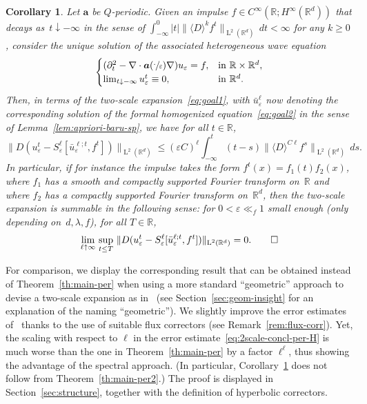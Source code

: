 \documentclass[10pt]{amsart}
\theoremstyle{plain}
\newtheorem{cor10}{Corollary}
\newenvironment{cor1}
{\renewcommand{\qedsymbol}{$\lozenge$}\pushQED{\qed}\begin{cor10}}
{\popQED\end{cor10}}
\theoremstyle{definition}
\numberwithin{equation}{section}
\newcommand{\e}{\varepsilon}
\newcommand{\R}{\mathbb R}
\newcommand{\Aa}{\boldsymbol a}
\newcommand{\Ld}{\operatorname{L}}
\begin{document}
\begin{cor1}\label{cor:summable}
Let $\Aa$ be $Q$-periodic. Given an impulse $f\in C^\infty(\R;H^\infty(\R^d))$ that decays as~$t\downarrow-\infty$ in the sense of $\int_{-\infty}^0|t|\|\langle D\rangle^kf^t\|_{\Ld^2(\R^d)}\,dt<\infty$ for any $k\ge0$,
consider the unique solution of the associated heterogeneous wave equation
\begin{equation*}
\begin{cases}
(\partial_t^2-\nabla\cdot\Aa(\sfrac\cdot\e)\nabla)u_\e=f,&\text{in $\R\times\R^d$},\\
{\lim_{t\downarrow -\infty}u_\e^t \equiv 0},&\text{in $\R^d$}.
\end{cases}
\end{equation*}
Then, in terms of the two-scale expansion~\eqref{eq:goal1}, with $\bar u_\e^\ell$ now denoting the corresponding solution of the formal homogenized equation~\eqref{eq:goal2} in the sense of Lemma~\ref{lem:apriori-baru-sp}, we have for all $t\in \R$,
\begin{equation}\label{e.bound-summable-1}
\|D(u_\e^t-S^{\ell}_\e[\bar u_\e^{\ell;t},f^t])\|_{\Ld^2(\R^d)} \le
(\e C)^\ell \int_{-\infty}^t(t-s)\|\langle D\rangle^{C\ell} f^s\|_{\Ld^2(\R^d)}\,ds.
\end{equation}
In particular, if for instance the impulse takes the form $f^t(x)=f_1(t)f_2(x)$, where $f_1$ has a smooth and compactly supported Fourier transform on~$\R$ and where $f_2$ has a compactly supported Fourier transform on~$\R^d$,
then the two-scale expansion is summable in the following sense: for $0<\e\ll_f 1$ small enough (only depending on~$d,\lambda,f$), for all $T\in\R$,
\begin{equation}\label{e.bound-summable-2}
\lim_{\ell\uparrow\infty}\,\sup_{t\le T}\,\|D(u_\e^t-S^{\ell}_\e[\bar u_\e^{\ell;t},f^t])\|_{\Ld^2(\R^d)} =0. \qedhere
\end{equation}
\end{cor1}

For comparison,
we display the corresponding result that can be obtained instead of Theorem~\ref{th:main-per} when using a more standard ``geometric'' approach to devise a two-scale expansion as in~\cite{ALR,Pouch-17,Pouch-19} (see Section~\ref{sec:geom-insight} for an explanation of the naming ``geometric'').
We slightly improve the error estimates of~\cite{ALR} thanks to {the} use of suitable flux correctors (see Remark~\ref{rem:flux-corr}). Yet, the scaling with respect to $\ell$ in the error estimate~\eqref{eq:2scale-concl-per-H} is much worse than the one in Theorem~\ref{th:main-per} by a factor $\ell^\ell$, thus showing the advantage of the spectral approach.
(In particular, Corollary~\ref{cor:summable} does not follow from Theorem~\ref{th:main-per2}.)
The proof is displayed in Section~\ref{sec:structure}, together with the definition of hyperbolic correctors.
\end{document}
